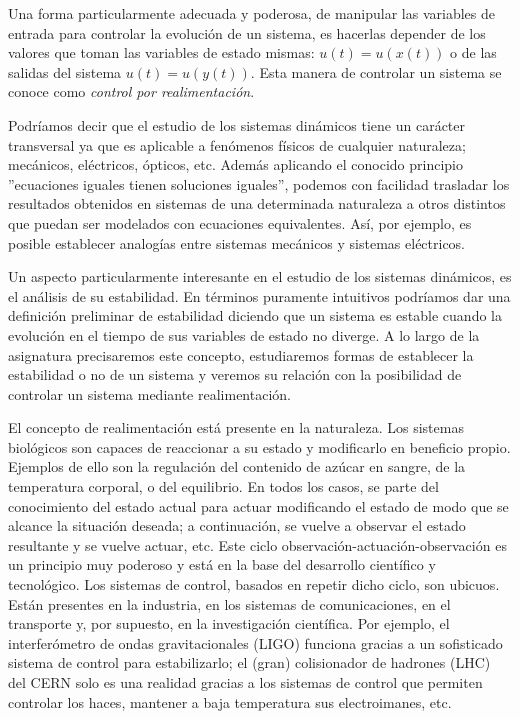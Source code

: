 \begin{enumerate}
Una forma particularmente adecuada y poderosa, de manipular las variables de entrada para controlar la evolución de un sistema, es hacerlas depender de los valores que toman las variables de estado mismas: $u(t) = u(x(t))$ o de las salidas del sistema $u(t) = u(y(t))$. Esta manera de controlar un sistema se conoce como \emph{control por realimentación}.
\end{enumerate}

Podríamos decir que el estudio de los sistemas dinámicos tiene un carácter transversal ya que es aplicable a fenómenos físicos de cualquier naturaleza; mecánicos, eléctricos, ópticos, etc. Además aplicando el conocido principio ''ecuaciones iguales tienen soluciones iguales'', podemos  con facilidad trasladar los resultados obtenidos en sistemas de una determinada naturaleza a otros distintos que puedan ser modelados con ecuaciones equivalentes. Así, por ejemplo, es posible establecer analogías entre sistemas mecánicos y sistemas eléctricos.

Un aspecto particularmente interesante en el estudio de los sistemas dinámicos, es el análisis de su estabilidad. En términos puramente intuitivos podríamos dar una definición preliminar de estabilidad diciendo que un sistema es estable cuando la evolución en el tiempo de sus variables de estado no diverge. A lo largo de la asignatura precisaremos este concepto, estudiaremos formas de establecer la estabilidad o no de un sistema y veremos su relación con la posibilidad de controlar un sistema mediante realimentación.

El concepto de realimentación está presente en la naturaleza. Los sistemas biológicos son capaces de reaccionar a su estado y modificarlo en beneficio propio.  Ejemplos de ello son la regulación del contenido de azúcar en sangre, de la temperatura corporal, o del equilibrio. En todos los casos, se parte del conocimiento del estado actual para actuar modificando el estado de modo que se alcance la situación deseada; a continuación, se vuelve a observar el estado resultante y se vuelve actuar, etc. Este ciclo observación-actuación-observación es un principio muy poderoso y está en la base del desarrollo científico y tecnológico. Los sistemas de control, basados en repetir dicho ciclo, son ubicuos. Están presentes en la industria, en los sistemas de comunicaciones, en el transporte y, por supuesto, en la investigación científica. Por ejemplo, el interferómetro de ondas gravitacionales  (LIGO) funciona gracias a un sofisticado sistema de control para estabilizarlo; el (gran) colisionador de hadrones (LHC) del CERN solo es una realidad gracias a los sistemas de control que permiten controlar los haces, mantener a baja temperatura sus electroimanes, etc.

